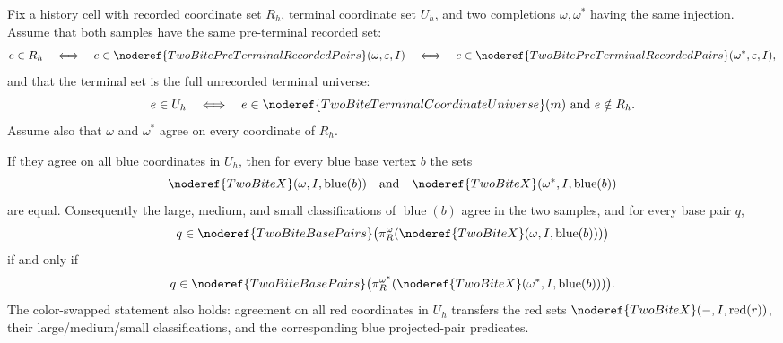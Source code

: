\begin{helper}
Fix a history cell with recorded coordinate set \(R_h\), terminal coordinate
set \(U_h\), and two completions \(\omega,\omega^\ast\) having the same
injection.  Assume that both samples have the same pre-terminal recorded set:
\[
e\in R_h
\quad\Longleftrightarrow\quad
e\in\noderef{TwoBitePreTerminalRecordedPairs}(\omega,\varepsilon,I)
\quad\Longleftrightarrow\quad
e\in\noderef{TwoBitePreTerminalRecordedPairs}(\omega^\ast,\varepsilon,I),
\]
and that the terminal set is the full unrecorded terminal universe:
\[
e\in U_h
\quad\Longleftrightarrow\quad
e\in\noderef{TwoBiteTerminalCoordinateUniverse}(m)\hbox{ and }e\notin R_h.
\]
Assume also that \(\omega\) and \(\omega^\ast\) agree on every coordinate of
\(R_h\).

If they agree on all blue coordinates in \(U_h\), then for every blue base
vertex \(b\) the sets
\[
\noderef{TwoBiteX}(\omega,I,\operatorname{blue}(b))
\quad\text{and}\quad
\noderef{TwoBiteX}(\omega^\ast,I,\operatorname{blue}(b))
\]
are equal.  Consequently the large, medium, and small classifications of
\(\operatorname{blue}(b)\) agree in the two samples, and for every base pair
\(q\),
\[
q\in\noderef{TwoBiteBasePairs}
\bigl(\pi_R^\omega(\noderef{TwoBiteX}(\omega,I,\operatorname{blue}(b)))\bigr)
\]
if and only if
\[
q\in\noderef{TwoBiteBasePairs}
\bigl(\pi_R^{\omega^\ast}
(\noderef{TwoBiteX}(\omega^\ast,I,\operatorname{blue}(b)))\bigr).
\]
The color-swapped statement also holds: agreement on all red coordinates in
\(U_h\) transfers the red sets
\(\noderef{TwoBiteX}(-,I,\operatorname{red}(r))\), their large/medium/small
classifications, and the corresponding blue projected-pair predicates.
\end{helper}
